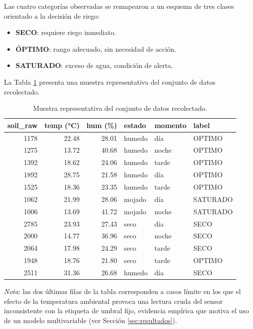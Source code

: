 \documentclass[12pt,a4paper]{article}
\begin{document}
Las cuatro categorías observadas se remapearon a un esquema de tres clases orientado a la decisión de riego:
\begin{itemize}
    \item \textbf{SECO}: requiere riego inmediato.
    \item \textbf{ÓPTIMO}: rango adecuado, sin necesidad de acción.
    \item \textbf{SATURADO}: exceso de agua, condición de alerta.
\end{itemize}

La Tabla \ref{tab:muestra_datos} presenta una muestra representativa del conjunto de datos recolectado.

\begin{table}[H]
\centering
\caption{Muestra representativa del conjunto de datos recolectado.}
\label{tab:muestra_datos}
\small
\begin{tabular}{@{}rrrlll@{}}
\toprule
\textbf{soil\_raw} & \textbf{temp (°C)} & \textbf{hum (\%)} & \textbf{estado} & \textbf{momento} & \textbf{label} \\
\midrule
1178 & 22.48 & 28.01 & humedo       & día    & OPTIMO   \\
1275 & 13.72 & 40.68 & humedo       & noche  & OPTIMO   \\
1392 & 18.62 & 24.06 & humedo       & tarde  & OPTIMO   \\
1892 & 28.75 & 21.58 & humedo        & día    & OPTIMO   \\
1525 & 18.36 & 23.35 & humedo        & tarde  & OPTIMO   \\
1062 & 21.99 & 28.06 & mojado        & día    & SATURADO \\
1006 & 13.69 & 41.72 & mojado        & noche  & SATURADO \\
2785 & 23.93 & 27.43 & seco          & día    & SECO     \\
2000 & 14.77 & 36.96 & seco          & noche  & SECO     \\
2064 & 17.98 & 24.29 & seco          & tarde  & SECO     \\
1948 & 18.76 & 21.80 & seco          & tarde  & OPTIMO   \\
2511 & 31.36 & 26.68 & humedo        & día    & SECO     \\
\bottomrule
\end{tabular}
\end{table}

\noindent \textit{Nota}: las dos últimas filas de la tabla corresponden a casos límite en los que el efecto de la temperatura ambiental provoca una lectura cruda del sensor inconsistente con la etiqueta de umbral fijo, evidencia empírica que motiva el uso de un modelo multivariable (ver Sección \ref{sec:resultados}).
\end{document}
